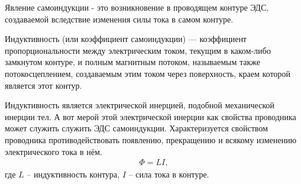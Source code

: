 \documentclass[__minimum__.tex]{subfiles}
\begin{document}
\begin{definition}
Явление самоиндукции - это возникновение в проводящем контуре ЭДС, создаваемой вследствие изменения силы тока в самом контуре.
\end{definition}
\begin{definition}
Индуктивность (или коэффициент самоиндукции) — коэффициент пропорциональности между электрическим током, текущим в каком-либо замкнутом контуре, и полным магнитным потоком, называемым также потокосцеплением, создаваемым этим током через поверхность, краем которой является этот контур.

Индуктивность является электрической инерцией, подобной механической инерции тел. А вот мерой этой электрической инерции как свойства проводника может служить служить ЭДС самоиндукции. Характеризуется свойством проводника противодействовать появлению, прекращению и всякому изменению электрического тока в нём.
\begin{gather*}
\Phi=LI,
\end{gather*}
где $L$ -- индуктивность контура, $I$ -- сила тока в контуре.
\end{definition}
\end{document}
